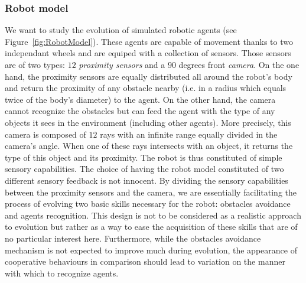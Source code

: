     \subsubsection{Robot model} We want to study the evolution of simulated robotic agents (see Figure~\ref{fig:RobotModel}). These agents are capable of movement thanks to two independant wheels and are equiped with a collection of sensors. Those sensors are of two types: $12$ \emph{proximity sensors} and a $90$ degrees front \emph{camera}. On the one hand, the proximity sensors are equally distributed all around the robot's body and return the proximity of any obstacle nearby (i.e. in a radius which equals twice of the body's diameter) to the agent. On the other hand, the camera cannot recognize the obstacles but can feed the agent with the type of any objects it sees in the environment (including other agents). More precisely, this camera is composed of $12$ rays with an infinite range equally divided in the camera's angle. When one of these rays intersects with an object, it returns the type of this object and its proximity. The robot is thus constituted of simple sensory capabilities. The choice of having the robot model constituted of two different sensory feedback is not innocent. By dividing the sensory capabilities between the proximity sensors and the camera, we are essentially facilitating the process of evolving two basic skills necessary for the robot: obstacles avoidance and agents recognition. This design is not to be considered as a realistic approach to evolution but rather as a way to ease the acquisition of these skills that are of no particular interest here. Furthermore, while the obstacles avoidance mechanism is not expected to improve much during evolution, the appearance of cooperative behaviours in comparison should lead to variation on the manner with which to recognize agents.

